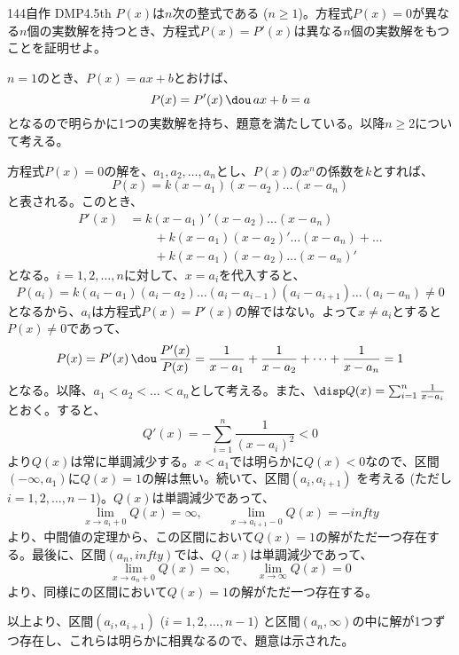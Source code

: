 \begin{thm}{144}{}{自作 DMP4.5th}
 $P(x)$は$n$次の整式である ($n\ge 1$)。方程式$P(x)=0$が異なる$n$個の実数解を持つとき、方程式$P(x)=P'(x)$は異なる$n$個の実数解をもつことを証明せよ。
\end{thm}

$n=1$のとき、$P(x)=ax+b$とおけば、
\[ P(x)=P'(x) \,\dou\, ax+b=a \]
となるので明らかに1つの実数解を持ち、題意を満たしている。以降$n\ge 2$について考える。

方程式$P(x)=0$の解を、$a_1, a_2, \dots , a_n$とし、$P(x)$の$x^n$の係数を$k$とすれば、
\[ P(x)=k(x-a_1)(x-a_2)\dots(x-a_n) \]
と表される。このとき、
\begin{align*}
 P'(x)&=k(x-a_1)' (x-a_2)\dots(x-a_n) \\
 &\qquad +k(x-a_1)(x-a_2)' \dots (x-a_n)+\dots \\
 &\qquad +k(x-a_1)(x-a_2)\dots(x-a_n)'
\end{align*}
となる。$i=1,2,\dots, n$に対して、$x=a_i$を代入すると、
\[ P(a_i)=k(a_i-a_1)(a_i-a_2)\dots(a_i-a_{i-1})(a_i-a_{i+1})\dots(a_i-a_n) \neq 0 \]
となるから、$a_i$は方程式$P(x)=P'(x)$の解ではない。よって$x\neq a_i$とすると$P(x)\neq 0$であって、
\[ P(x)=P'(x) \,\dou\, \frac{P'(x)}{P(x)}=\frac{1}{x-a_1}+\frac{1}{x-a_2}+\dots+\frac{1}{x-a_n}=1 \]
となる。以降、$a_1<a_2<\dots<a_n$として考える。また、$\disp Q(x)=\sum_{i=1}^n \frac{1}{x-a_i}$とおく。すると、
\[ Q'(x)=-\sum_{i=1}^n \frac{1}{(x-a_i)^2} < 0 \]
より$Q(x)$は常に単調減少する。$x<a_1$では明らかに$Q(x)<0$なので、区間$(-\infty, a_1)$に$Q(x)=1$の解は無い。続いて、区間$(a_i, a_{i+1})$ を考える (ただし$i=1, 2, \dots, n-1$)。$Q(x)$は単調減少であって、
\[ \lim_{x\to a_i+0} Q(x)=\infty, \qquad \lim_{x\to a_{i+1}-0} Q(x)=-infty \]
より、中間値の定理から、この区間において$Q(x)=1$の解がただ一つ存在する。最後に、区間$(a_n, infty)$では、$Q(x)$は単調減少であって、
\[ \lim_{x\to a_n+0} Q(x)=\infty, \qquad \lim_{x\to\infty} Q(x)=0 \]
より、同様にの区間において$Q(x)=1$の解がただ一つ存在する。

以上より、区間$(a_i, a_{i+1})$ ($i=1,2,\dots, n-1$) と区間$(a_n, \infty)$の中に解が1つずつ存在し、これらは明らかに相異なるので、題意は示された。